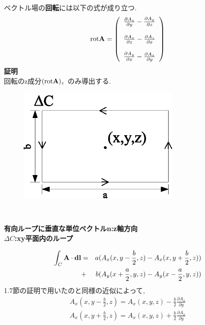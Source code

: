 \documentclass{jsarticle}
\begin{document}
ベクトル場の{\bf 回転}には以下の式が成り立つ.
\begin{equation}
\mathrm{rot}{\bf A} =
\left( 
\begin{array}{cc}
\frac{\partial A_z}{\partial y}-\frac{\partial A_y}{\partial z}\\
\\
\frac{\partial A_x}{\partial z}-\frac{\partial A_z}{\partial x}\\
\\
\frac{\partial A_y}{\partial x}-\frac{\partial A_x}{\partial y}\\
\end{array}
\right)
\end{equation}
{\bf 証明} \\
回転のz成分$(\mathrm{rot}{\bf A})_z$ のみ導出する.\\
\begin{figure}[htbp]
 \begin{center}
  \includegraphics[width=80mm]{4.3.eps}
 \end{center}
 \caption{}
 \label{fig:three}
\end{figure}
\\
\begin{center}
\bf{有向ループに垂直な単位ベクトル{\bf n}:z軸方向} \\
\bf{ $\Delta C$:xy平面内のループ} \\
\end{center}
\begin{eqnarray}
\int_{C}^{} {\bf A} \cdot {\bf dl} &=& a( A_x(x,y-\frac{b}{2},z)-A_x(x,y+\frac{b}{2},z) ) \\
&+&b ( A_y(x+\frac{a}{2},y,z)-A_y(x-\frac{a}{2},y,z) )
\end{eqnarray}
1.7節の証明で用いたのと同様の近似によって,
\begin{eqnarray}
A_x(x,y-\frac{b}{2},z) = A_x(x,y,z)-\frac{b}{2} \frac{\partial A_x}{\partial y} \\
A_x(x,y+\frac{b}{2},z) = A_x(x,y,z)+\frac{b}{2} \frac{\partial A_x}{\partial y}
\end{eqnarray}
\end{document}
